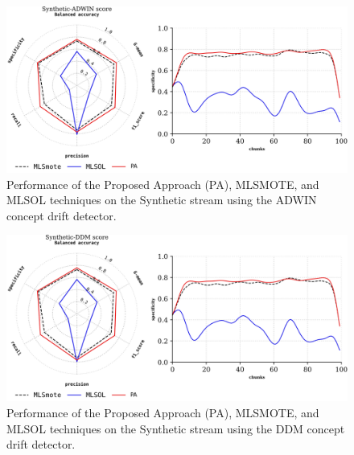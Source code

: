 \begin{figure}[!ht]
	\centering
	\includegraphics[width=1\linewidth]{4_Imbalanced/figures/exp_5.png}
  \caption{Performance of the Proposed Approach (PA), MLSMOTE, and MLSOL techniques on the Synthetic stream using the ADWIN concept drift detector.}
	\label{fig:4_first_proposal_result_exp_5}
\end{figure}

\begin{figure}[!ht]
	\centering
	\includegraphics[width=1\linewidth]{4_Imbalanced/figures/exp_6.png}
  \caption{Performance of the Proposed Approach (PA), MLSMOTE, and MLSOL techniques on the Synthetic stream using the DDM concept drift detector.}
	\label{fig:4_first_proposal_result_exp_6}
\end{figure}


